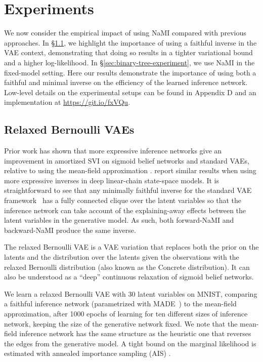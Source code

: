 \section{Experiments}\label{sec:applications}
We now consider the empirical impact of using NaMI compared with previous approaches.
In \S\ref{sec:vae-experiment}, we highlight the importance of using a faithful inverse in the VAE context, demonstrating that doing so results in a tighter variational bound and a higher log-likelihood.
In \S\ref{sec:binary-tree-experiment}, we use NaMI in the fixed-model setting.
Here our results demonstrate the importance of using both a faithful and minimal inverse on the efficiency of the learned inference network.
Low-level details on the experimental setups can be found in Appendix D and an implementation at {\small \url{https://git.io/fxVQu}}.

\subsection{Relaxed Bernoulli VAEs}\label{sec:vae-experiment}

Prior work has shown that more expressive inference networks give an improvement in amortized SVI on sigmoid belief networks and standard VAEs, relative to using the mean-field approximation \citep{UriaEtAl2016, MaaloeEtAl2016, RezendeMohamed2015, KingmaEtAl2016}. \citet{KrishnanEtAl2017} report similar results when using more expressive inverses in deep linear-chain state-space models.
It is straightforward to see that any minimally faithful inverse for the standard VAE framework~\citep{KingmaWelling2013}
has a fully connected clique over the latent variables so that the inference network can take account of the explaining-away effects between the latent variables in the generative model.
As such, both forward-NaMI and backward-NaMI produce the same inverse.

The relaxed Bernoulli VAE \citep{MaddisonEtAl2016, JangEtAl2016} is a VAE variation that replaces both the prior on the latents and the distribution over the latents given the observations with the relaxed Bernoulli distribution (also known as the Concrete distribution). It can also be understood as a ``deep'' continuous relaxation of sigmoid belief networks.

We learn a relaxed Bernoulli VAE with 30 latent variables on MNIST, comparing a faithful inference network (parametrized with MADE~\citep{GermainEtAl2015}) to the mean-field approximation, after 1000 epochs of learning for
ten different sizes of inference network, keeping the size of the generative network fixed. We note that {the mean-field inference network has the same structure as the heuristic one that reverses the edges from the generative model}. A tight bound on the marginal likelihood is estimated with annealed importance sampling (AIS) \citep{Neal1998, WuEtAl2016b}.

